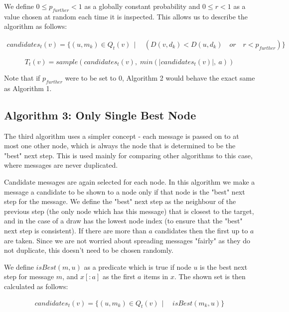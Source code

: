 \documentclass[bsc,frontabs,twoside,singlespacing,parskip,deptreport]{infthesis}     %
\begin{document}
We define $0 \leq p_{further} < 1$ as a globally constant probability and $0 \leq r < 1$ as a value chosen at random each time it is inspected. This allows us to describe the algorithm as follows:

\begin{equation}
\begin{split}
candidates_{t}(v) = \{ (u, m_{k}) \in Q_{t}(v) \:\: | \:\: & (D(v, d_{k}) < D(u, d_{k}) \quad or \quad r < p_{further}) \}
\end{split}
\end{equation}

\begin{equation}
T_{t}(v) = sample(candidates_{t}(v), \; min(|candidates_{t}(v)|, \: a))
\end{equation}

Note that if $p_{further}$ were to be set to 0, Algorithm 2 would behave the exact same as Algorithm 1.

\subsection{Algorithm 3: Only Single Best Node}
The third algorithm uses a simpler concept - each message is passed on to at most one other node, which is always the node that is determined to be the "best" next step. This is used mainly for comparing other algorithms to this case, where messages are never duplicated.

Candidate messages are again selected for each node. In this algorithm we make a message a candidate to be shown to a node only if that node is the "best" next step for the message. We define the "best" next step as the neighbour of the previous step (the only node which has this message) that is closest to the target, and in the case of a draw has the lowest node index (to ensure that the "best" next step is consistent). If there are more than $a$ candidates then the first up to $a$ are taken. Since we are not worried about spreading messages "fairly" as they do not duplicate, this doesn't need to be chosen randomly. 

We define $isBest(m, u)$ as a predicate which is true if node $u$ is the best next step for message $m$, and $x[:a]$ as the first $a$ items in $x$. The shown set is then calculated as follows:

\begin{equation}
\begin{split}
candidates_{t}(v) = \{ (u, m_{k}) \in Q_{t}(v) \:\: | \:\: & isBest(m_{k}, u) \}
\end{split}
\end{equation}
\end{document}
